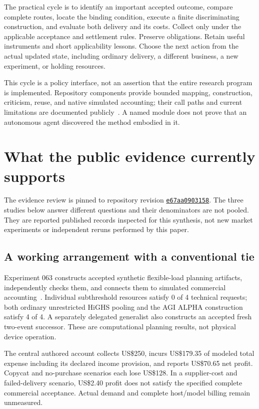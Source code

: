 \documentclass[10pt,a4paper]{article}
\newcommand{\evidencecommit}{e67aa09031583f976a39c8406ae86585b02cde76}
\newcommand{\repo}{https://github.com/MontrealAI/AGI-Alpha-Invention-Flywheel-Lab}
\begin{document}
The practical cycle is to identify an important accepted outcome, compare complete routes, locate the binding condition, execute a finite discriminating construction, and evaluate both delivery and its costs. Collect only under the applicable acceptance and settlement rules. Preserve obligations. Retain useful instruments and short applicability lessons. Choose the next action from the actual updated state, including ordinary delivery, a different business, a new experiment, or holding resources.

This cycle is a policy interface, not an assertion that the entire research program is implemented. Repository components provide bounded mapping, construction, criticism, reuse, and native simulated accounting; their call paths and current limitations are documented publicly~\citep{mandate}. A named module does not prove that an autonomous agent discovered the method embodied in it.

\section{What the public evidence currently supports}\label{sec:evidence}

The evidence review is pinned to repository revision \href{\repo/tree/\evidencecommit}{\texttt{e67aa0903158}}. The three studies below answer different questions and their denominators are not pooled. They are reported published records inspected for this synthesis, not new market experiments or independent reruns performed by this paper.

\subsection{A working arrangement with a conventional tie}

Experiment 063 constructs accepted synthetic flexible-load planning artifacts, independently checks them, and connects them to simulated commercial accounting~\citep{exp063}. Individual subthreshold resources satisfy 0 of 4 technical requests; both ordinary unrestricted HiGHS pooling and the AGI ALPHA construction satisfy 4 of 4. A separately delegated generalist also constructs an accepted fresh two-event successor. These are computational planning results, not physical device operation.

The central authored account collects US\$250, incurs US\$179.35 of modeled total expense including its declared income provision, and reports US\$70.65 net profit. Copycat and no-purchase scenarios each lose US\$128. In a supplier-cost and failed-delivery scenario, US\$2.40 profit does not satisfy the specified complete commercial acceptance. Actual demand and complete host/model billing remain unmeasured.
\end{document}
